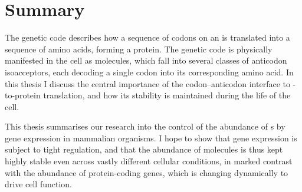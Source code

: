\chapter*{Summary}

The genetic code describes how a sequence of codons on an  is
translated into a sequence of amino acids, forming a protein. The genetic code
is physically manifested in the cell as  molecules, which fall into
several classes of anticodon isoacceptors, each decoding a single codon into its
corresponding amino acid. In this thesis I discuss the central importance of the
codon--anticodon interface to -to-protein translation, and how its
stability is maintained during the life of the cell.

This thesis summarises our research into the control of the abundance of
s by  gene expression in mammalian organisms. I hope to
show that  gene expression is subject to tight regulation, and that
the abundance of  molecules is thus kept highly stable even across
vastly different cellular conditions, in marked contrast with the abundance of
protein-coding genes, which is changing dynamically to drive cell function.
